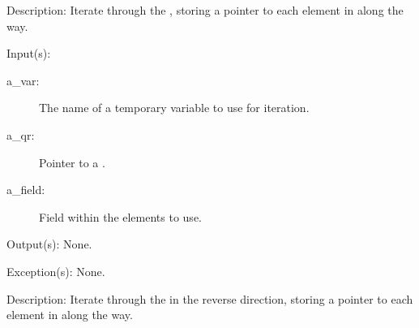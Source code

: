\begin{capi}
\begin{capilist}
	\item[Description: ]
		Iterate through the , storing a pointer to each
		element in  along the way.
	\end{capilist}
\label{qr_foreach_reverse}
	\begin{capilist}
	\item[Input(s): ]
		\begin{description}\item[]
		\item[a\_var: ]
			The name of a temporary variable to use for iteration.
		\item[a\_qr: ]
			Pointer to a .
		\item[a\_field: ]
			Field within the  elements to use.
		\end{description}
	\item[Output(s): ] None.
	\item[Exception(s): ] None.
	\item[Description: ]
		Iterate through the  in the reverse direction,
		storing a pointer to each element in  along the
		way.
	\end{capilist}
\end{capi}
